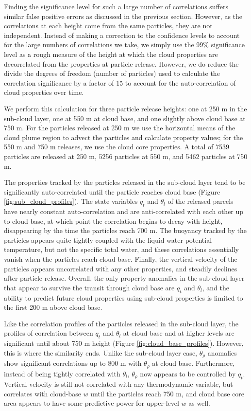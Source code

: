 \documentclass[acp]{copernicus}
\begin{document}
Finding the significance level for such a large number of correlations suffers 
similar false positive errors as discussed in the previous section.  However, 
as the correlations at each height come from the same particles, they are not 
independent.  Instead of making a correction to the confidence levels to 
account for the large numbers of correlations we take, we simply use the 99\% 
significance level as a rough measure of the height at which the cloud 
properties are decorrelated from the properties at particle release.  However, 
we do reduce the divide the degrees of freedom (number of particles) used to 
calculate the correlation significance by a factor of 15 to account for the 
auto-correlation of cloud properties over time.

We perform this calculation for three particle release heights: one at 250 m in 
the sub-cloud layer, one at 550 m at cloud base, and one slightly above cloud 
base at 750 m.  For the particles released at 250 m we use the horizontal means 
of the cloud plume region to advect the particles and calculate property values; 
for the 550 m and 750 m releases, we use the cloud core properties.  A total of 
7539 particles are released at 250 m, 5256 particles at 550 m, and 5462 
particles at 750 m.

The properties tracked by the particles released in the sub-cloud layer tend to 
be significantly auto-correlated until the particle reaches cloud base (Figure 
\ref{fig:sub_cloud_profiles}).  The state variables $q_t$ and $\theta_l$ of 
the released parcels have nearly constant auto-correlation and are 
anti-correlated with each other up to cloud base, at which point the correlation 
begins to decay with height, disappearing by the time the particles reach 
700 m.  The buoyancy tracked by the particles appears quite tightly coupled 
with the liquid-water potential temperature, but not the specific total water, 
and these correlations essentially vanish when the particles reach cloud base.  
Finally, the vertical velocity of the particles appears uncorrelated with any 
other properties, and steadily declines after particle release.  Overall, the 
only property anomalies in the sub-cloud layer that appear to survive the 
transit through cloud base are $q_t$ and $\theta_l$, and the ability to 
predict future cloud properties using sub-cloud properties is limited to the 
first 200 m above cloud base.

Like the correlation profiles of the particles released in the sub-cloud 
layer, the profiles of correlation between $q_t$ and $\theta_l$ at cloud base 
and at higher levels are significant until about 750 m height (Figure 
\ref{fig:cloud_base_profiles}).  However, this is where the similarity ends.   
Unlike the sub-cloud layer case, $\theta_\rho$ anomalies show significant 
correlations up to 800 m with $\theta_\rho$ at cloud base.  Furthermore, 
instead of being tightly correlated with $\theta_l$, $\theta_\rho$ now 
appears to be controlled by $q_t$.  Vertical velocity is still not correlated 
with any thermodynamic variable, but correlates with cloud-base $w$ until the 
particles reach 750 m, and cloud base core area appears to have some predictive 
power for upper-level $w$ as well.
\end{document}
